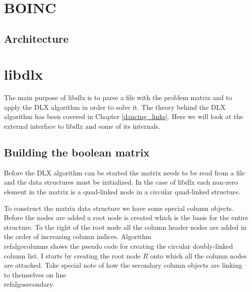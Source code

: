 



\section{BOINC}

\subsection{Architecture}


\section{libdlx}

The main purpose of libdlx is to parse a file with the problem matrix and to apply the DLX algorithm in order to solve it.
The theory behind the DLX algorithm has been covered in Chapter \ref{dancing_links}.
Here we will look at the external interface to libdlx and some of its internals.



\subsection{Building the boolean matrix}
\label{matrix_construction}

Before the DLX algorithm can be started the matrix needs to be read from a file and the data structures must be initialized.
In the case of libdlx each non-zero element in the matrix is a quad-linked node in a circular quad-linked structure.

To construct the matrix data structure we have some special column objects.
Before the nodes are added a root node is created which is the basis for the entire structure.
To the right of the root node all the column header nodes are added in the order of increasing column indices.
Algorithm~\\ref{algocolumns} shows the pseudo code for creating the circular doubly-linked column list.
I starts by creating the root node $R$ onto which all the column nodes are attached.
Take special note of how the secondary column objects are linking to themselves on line~\\ref{algosecondary}.


